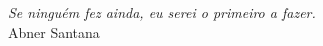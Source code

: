 \begin{epigrafe}
  \vspace*{\fill}
  \begin{flushright}
    \textit
    {
      Se ninguém fez ainda, eu serei o primeiro a fazer.  \\
    }\medskip %
    Abner Santana
  \end{flushright}
\end{epigrafe}
\newpage